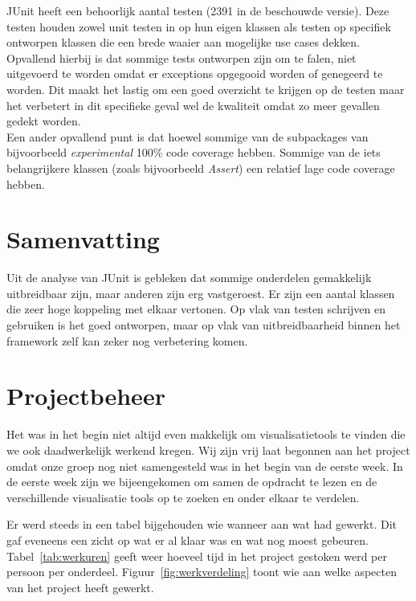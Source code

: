 \documentclass[i1]{oss}
\begin{document}
JUnit heeft een behoorlijk aantal testen (2391 in de beschouwde versie). Deze testen houden zowel unit testen in op hun eigen klassen als testen op specifiek ontworpen klassen die een brede waaier aan mogelijke use cases dekken.
\\
Opvallend hierbij is dat sommige tests ontworpen zijn om te falen, niet uitgevoerd te worden omdat er exceptions opgegooid worden of genegeerd te worden. Dit maakt het lastig om een goed overzicht te krijgen op de testen maar het verbetert in dit specifieke geval wel de kwaliteit omdat zo meer gevallen gedekt worden.
\\
Een ander opvallend punt is dat hoewel sommige van de subpackages van bijvoorbeeld \emph{experimental} 100\% code coverage hebben. Sommige van de iets belangrijkere klassen (zoals bijvoorbeeld \emph{Assert}) een relatief lage code coverage hebben.
\section{Samenvatting}

Uit de analyse van JUnit is gebleken dat sommige onderdelen gemakkelijk uitbreidbaar zijn, maar anderen zijn erg vastgeroest. Er zijn een aantal klassen die zeer hoge koppeling met elkaar vertonen. 
Op vlak van testen schrijven en gebruiken is het goed ontworpen, maar op vlak van uitbreidbaarheid binnen het framework zelf kan zeker nog verbetering komen.   


\section{Projectbeheer}

Het was in het begin niet altijd even makkelijk om visualisatietools te vinden die we ook daadwerkelijk werkend kregen.
Wij zijn vrij laat begonnen aan het project omdat onze groep nog niet samengesteld was in het begin van de eerste week. In de eerste week zijn we bijeengekomen om samen de opdracht te lezen en de verschillende visualisatie tools op te zoeken en onder elkaar te verdelen. 

Er werd steeds in een tabel bijgehouden wie wanneer aan wat had gewerkt. Dit gaf eveneens een zicht op wat er al klaar was en wat nog moest gebeuren. \\
Tabel~\ref{tab:werkuren} geeft weer hoeveel tijd in het project gestoken werd per persoon per onderdeel. Figuur~\ref{fig:werkverdeling} toont wie aan welke aspecten van het project heeft gewerkt.
\end{document}
